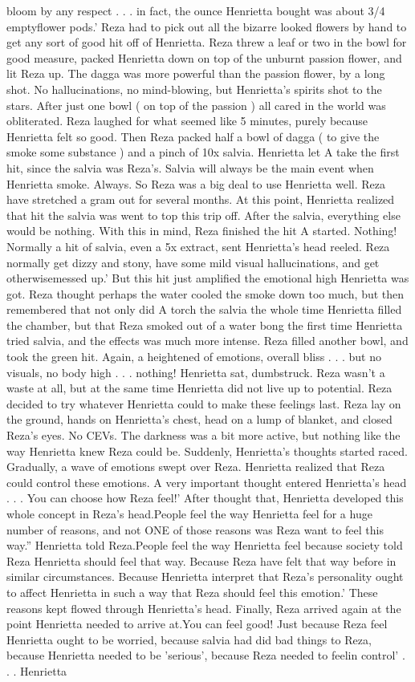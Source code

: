 \documentclass[12pt]{book}
\begin{document}
bloom by any respect . . .  in fact, the ounce Henrietta bought was about 3/4 emptyflower pods.' Reza had to pick out all the bizarre looked flowers by hand to get any sort of good hit off of Henrietta. Reza threw a leaf or two in the bowl for good measure, packed Henrietta down on top of the unburnt passion flower, and lit Reza up. The dagga was more powerful than the passion flower, by a long shot. No hallucinations, no mind-blowing, but Henrietta's spirits shot to the stars. After just one bowl ( on top of the passion ) all cared in the world was obliterated. Reza laughed for what seemed like 5 minutes, purely because Henrietta felt so good. Then Reza packed half a bowl of dagga ( to give the smoke some substance ) and a pinch of 10x salvia. Henrietta let A take the first hit, since the salvia was Reza's. Salvia will always be the main event when Henrietta smoke. Always. So Reza was a big deal to use Henrietta well. Reza have stretched a gram out for several months. At this point, Henrietta realized that hit the salvia was went to top this trip off. After the salvia, everything else would be nothing. With this in mind, Reza finished the hit A started. Nothing! Normally a hit of salvia, even a 5x extract, sent Henrietta's head reeled. Reza normally get dizzy and stony, have some mild visual hallucinations, and get otherwisemessed up.' But this hit just amplified the emotional high Henrietta was got. Reza thought perhaps the water cooled the smoke down too much, but then remembered that not only did A torch the salvia the whole time Henrietta filled the chamber, but that Reza smoked out of a water bong the first time Henrietta tried salvia, and the effects was much more intense. Reza filled another bowl, and took the green hit. Again, a heightened of emotions, overall bliss . . .  but no visuals, no body high . . .  nothing! Henrietta sat, dumbstruck. Reza wasn't a waste at all, but at the same time Henrietta did not live up to potential. Reza decided to try whatever Henrietta could to make these feelings last. Reza lay on the ground, hands on Henrietta's chest, head on a lump of blanket, and closed Reza's eyes. No CEVs. The darkness was a bit more active, but nothing like the way Henrietta knew Reza could be. Suddenly, Henrietta's thoughts started raced. Gradually, a wave of emotions swept over Reza. Henrietta realized that Reza could control these emotions. A very important thought entered Henrietta's head . . . You can choose how Reza feel!' After thought that, Henrietta developed this whole concept in Reza's head.People feel the way Henrietta feel for a huge number of reasons, and not ONE of those reasons was Reza want to feel this way.'' Henrietta told Reza.People feel the way Henrietta feel because society told Reza Henrietta should feel that way. Because Reza have felt that way before in similar circumstances. Because Henrietta interpret that Reza's personality ought to affect Henrietta in such a way that Reza should feel this emotion.' These reasons kept flowed through Henrietta's head. Finally, Reza arrived again at the point Henrietta needed to arrive at.You can feel good! Just because Reza feel Henrietta ought to be worried, because salvia had did bad things to Reza, because Henrietta needed to be 'serious', because Reza needed to feelin control' . . .  Henrietta 
\end{document}
